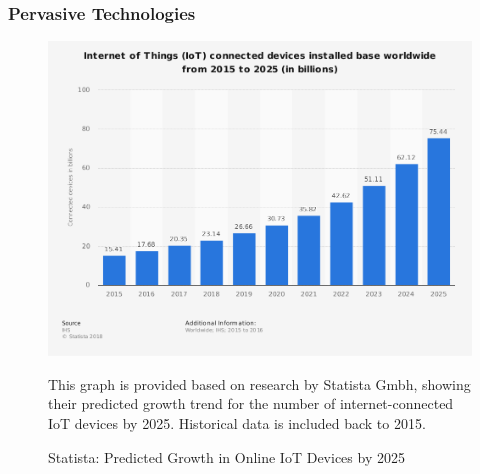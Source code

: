 \subsubsection{Pervasive Technologies}


\begin{figure}[ht]
      \centering
      \includegraphics[width=150mm, scale=1]{Images/statista_iot.png}
      \caption{Statista: Predicted Growth in Online IoT Devices by 2025}
      \medskip
	  \small
		This graph is provided based on research by Statista Gmbh, showing their predicted growth trend for the number of internet-connected IoT devices by 2025. Historical data is included back to 2015.  
\label{fig:StatistaIoTPrediction}
\end{figure}

